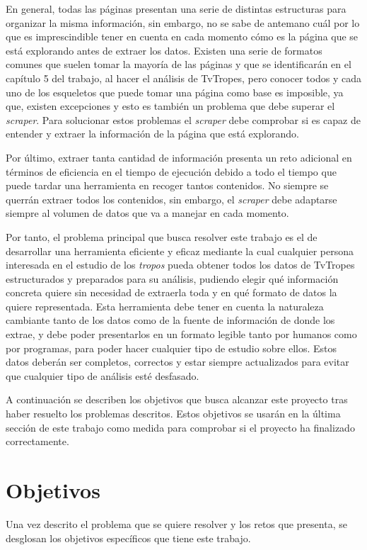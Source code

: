 En general, todas las páginas presentan una serie de distintas estructuras para
organizar la misma información, sin embargo, no se sabe de antemano cuál por lo
que es imprescindible tener en cuenta en cada momento cómo es la página que se
está explorando antes de extraer los datos. Existen una serie de formatos
comunes que suelen tomar la mayoría de las páginas y que se identificarán en el
capítulo 5 del trabajo, al hacer el análisis de TvTropes, pero conocer todos y
cada uno de los esqueletos que puede tomar una página como base es imposible, ya
que, existen excepciones y esto es también un problema que debe superar el
\textit{scraper}. Para solucionar estos problemas el \textit{scraper} debe
comprobar si es capaz de entender y extraer la información de la página que está
explorando.

Por último, extraer tanta cantidad de información presenta un reto adicional en
términos de eficiencia en el tiempo de ejecución debido a todo el tiempo que
puede tardar una herramienta en recoger tantos contenidos. No siempre se querrán
extraer todos los contenidos, sin embargo, el \textit{scraper} debe adaptarse
siempre al volumen de datos que va a manejar en cada momento.

Por tanto, el problema principal que busca resolver este trabajo es el de
desarrollar una herramienta eficiente y eficaz mediante la cual cualquier
persona interesada en el estudio de los \textit{tropos} pueda obtener todos los
datos de TvTropes estructurados y preparados para su análisis, pudiendo elegir
qué información concreta quiere sin necesidad de extraerla toda y en qué formato
de datos la quiere representada. Esta herramienta debe tener en cuenta la
naturaleza cambiante tanto de los datos como de la fuente de información de
donde los extrae, y debe poder presentarlos en un formato legible tanto por
humanos como por programas, para poder hacer cualquier tipo de estudio sobre
ellos. Estos datos deberán ser completos, correctos y estar siempre actualizados
para evitar que cualquier tipo de análisis esté desfasado.

A continuación se describen los objetivos que busca alcanzar este proyecto tras
haber resuelto los problemas descritos. Estos objetivos se usarán en la última
sección de este trabajo como medida para comprobar si el proyecto ha finalizado
correctamente.

\section{Objetivos}
Una vez descrito el problema que se quiere resolver y los retos que presenta, se
desglosan los objetivos específicos que tiene este trabajo.

